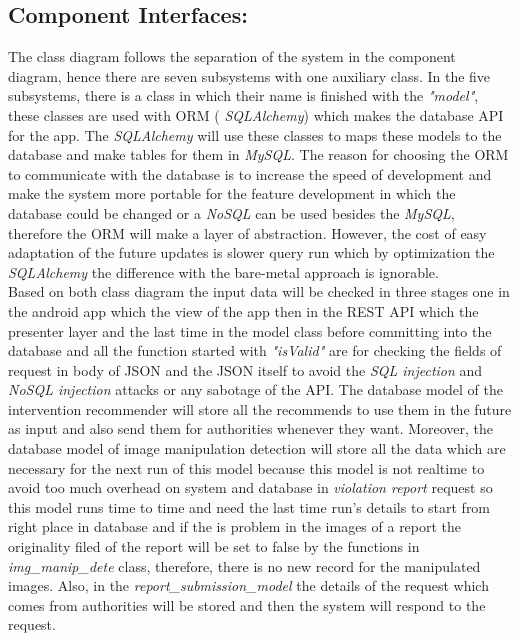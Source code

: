 \subsection{Component Interfaces:}

The class diagram follows the separation of the system in the component diagram, hence there are seven subsystems with one auxiliary class. In the five subsystems, there is a class in which their name is finished with the  \emph{"model"}, these classes are used with ORM ( \emph{SQLAlchemy}) which makes the database API for the app. The  \emph{SQLAlchemy} will use these classes to maps these models to the database and make tables for them in  \emph{MySQL}. The reason for choosing the ORM to communicate with the database is to increase the speed of development and make the system more portable for the feature development in which the database could be changed or a  \emph{NoSQL} can be used besides the  \emph{MySQL}, therefore the ORM will make a layer of abstraction. However, the cost of easy adaptation of the future updates is slower query run which by optimization the  \emph{SQLAlchemy} the difference with the bare-metal approach is ignorable.\\
Based on both class diagram the input data will be checked in three stages one in the android app which the view of the app then in the REST API which the presenter layer and the last time in the model class before committing into the database and all the function started with  \emph{"isValid"} are for checking the fields of request in body of JSON and the JSON itself to avoid the  \emph{SQL injection} and  \emph{NoSQL injection} attacks or any sabotage of the API. The database model of the intervention recommender will store all the recommends to use them in the future as input and also send them for authorities whenever they want. Moreover, the database model of image manipulation detection will store all the data which are necessary for the next run of this model because this model is not realtime to avoid too much overhead on system and database in  \emph{violation report} request so this model runs time to time and need the last time run's details to start from right place in database and if the is problem in the images of a report the originality filed of the report will be set to false by the functions in  \emph{img\_manip\_dete} class, therefore, there is no new record for the manipulated images. Also, in the  \emph{report\_submission\_model} the details of the request which comes from authorities will be stored and then the system will respond to the request.\\
